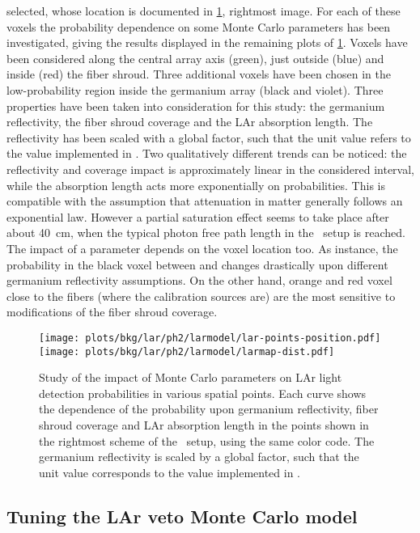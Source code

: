 selected, whose location is documented in \cref{fig:bkg:lar:ph2:larmap:dist}, rightmost
image. For each of these voxels the probability dependence on some Monte Carlo parameters
has been investigated, giving the results displayed in the remaining plots of
\cref{fig:bkg:lar:ph2:larmap:dist}. Voxels have been considered along the central array
axis (green), just outside (blue) and inside (red) the fiber shroud. Three additional
voxels have been chosen in the low-probability region inside the germanium array (black
and violet). Three properties have been taken into consideration for this study: the
germanium reflectivity, the fiber shroud coverage and the LAr absorption length. The
reflectivity has been scaled with a global factor, such that the unit value refers to the
value implemented in \mage. Two qualitatively different trends can be noticed: the
reflectivity and coverage impact is approximately linear in the considered interval, while
the absorption length acts more exponentially on probabilities. This is compatible with
the assumption that attenuation in matter generally follows an exponential law. However a
partial saturation effect seems to take place after about 40~cm, when the typical photon
free path length in the \gerda\ setup is reached. The impact of a parameter depends on the
voxel location too. As instance, the probability in the black voxel between  and
 changes drastically upon different germanium reflectivity assumptions. On the
other hand, orange and red voxel close to the fibers (where the calibration sources are)
are the most sensitive to modifications of the fiber shroud coverage.

\begin{figure}
  \centering
  \texttt{[image: plots/bkg/lar/ph2/larmodel/lar-points-position.pdf]}
  \texttt{[image: plots/bkg/lar/ph2/larmodel/larmap-dist.pdf]}
  \caption{%
    Study of the impact of Monte Carlo parameters on LAr light detection probabilities in
    various spatial points. Each curve shows the dependence of the probability upon
    germanium reflectivity, fiber shroud coverage and LAr absorption length in the points
    shown in the rightmost scheme of the \gerda\ setup, using the same color code. The
    germanium reflectivity is scaled by a global factor, such that the unit value
    corresponds to the value implemented in \mage. 
  }\label{fig:bkg:lar:ph2:larmap:dist}
\end{figure}

\subsection{Tuning the LAr veto Monte Carlo model}%
\label{sec:bkg:lar:ph2:pcalib}

